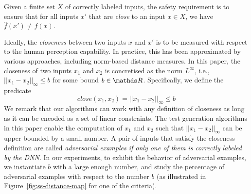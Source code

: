 \documentclass[runningheads,a4paper]{llncs}
\newcommand{\xiaowei}[1]{{\color{blue}#1}}
\newcommand{\distance}[2]{ ||#1||_{#2}}
\begin{document}
\begin{definition} \label{def:requirement}
  Given a finite set $X$ of correctly labeled inputs, the safety  requirement is to ensure that for all  inputs $x'$ that are \emph{close} to an input $x\in X$, we have $\hat{f}(x') \neq f(x)$. 
\end{definition}%

Ideally, the \emph{closeness} between two inputs $x$ and $x'$ is to be measured with respect to the human perception capability. In practice, this has been approximated by various approaches, including norm-based distance measures.  In this paper, the closeness of two inputs $x_1$ and $x_2$  is concretised as the norm $L^\infty$, i.e., $\distance{x_1-x_2}{\infty} \leq b$ for some bound $b \in \real$. Specifically, we define the predicate
\begin{equation}
close(x_1,x_2) = \distance{x_1-x_2}{\infty} \leq b
\end{equation}
We remark that our algorithms can work with any definition of closeness as long as it can be encoded as a set of linear constraints. The test generation algorithms in this paper enable the computation of $x_1$ and $x_2$ such that $\distance{x_1-x_2}{\infty}$ 
can be upper bounded by a small number.
A pair of inputs that satisfy the closeness definition are called \emph{adversarial examples if only one of them is correctly labeled by the DNN}.
In our experiments, to exhibit the behavior of adversarial examples, 
we instantiate $b$ with a large enough number, and study the percentage of adversarial examples with respect to the number $b$ (as illustrated in Figure~\ref{fig:ss-distance-map} for one of the criteria). 
\end{document}
